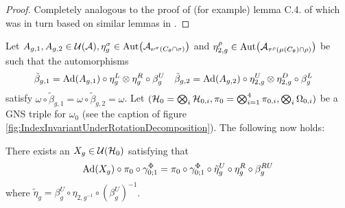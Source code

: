 \documentclass[11pt,a4paper,twoside]{article}
\numberwithin{equation}{section}
\begin{document}
	\begin{proof}
		Completely analogous to the proof of (for example) lemma C.4. of \cite{jappens2023spt} which was in turn based on similar lemmas in \cite{ogata2021h3gmathbb}.
	\end{proof}
	Let $A_{g,1},A_{g,2}\in\UU(\AA),\eta^\sigma_g\in\Aut{\AA_{\nu^{\sigma}(C_\theta\cap\sigma)}}$ and $\eta^\rho_{2,g}\in\Aut{\AA_{\tau^{\rho}(\mu(C_\theta)\cap\rho)}}$ be such that the automorphisms
	\begin{align}
		\tilde{\beta}_{g,1}&=\Ad{A_{g,1}}\circ\eta_g^L\otimes\eta_g^R\circ\beta_g^U&\tilde{\beta}_{g,2}&=\Ad{A_{g,2}}\circ\eta_{2,g}^U\otimes\eta_{2,g}^D\circ\beta_g^L
	\end{align}
	satisfy $\omega\circ\tilde{\beta}_{g,1}=\omega\circ\tilde{\beta}_{g,2}=\omega$. Let $(\mathcal H_0=\bigotimes_i\mathcal H_{0,i},\pi_0=\bigotimes_{i=1}^4\pi_{0,i},\bigotimes_i\Omega_{0,i})$ be a GNS triple for $\omega_0$ (see the caption of figure \ref{fig:IndexInvariantUnderRotationDecomposition}). The following now holds:
	\begin{lemma}\label{lem:DefinitionX_gLemma}
		There exists an $X_g\in\mathcal U(\mathcal H_0)$ satisfying that
		\begin{equation}\label{eq:DefinitionX_gLemma}
			\Ad{X_g}\circ\pi_0\circ\gamma^\Phi_{0;1}=\pi_0\circ\gamma^\Phi_{0;1}\circ\tilde{\eta}^U_g\circ\eta^R_g\circ\beta_g^{RU}
		\end{equation}
		where $\tilde{\eta}_g=\beta_g^U\circ\eta_{2,g^{-1}}\circ(\beta_g^U)^{-1}$.
	\end{lemma}
\end{document}
